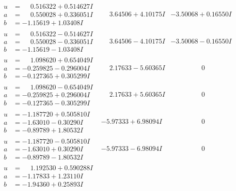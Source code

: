 \documentclass[1p]{elsarticle_modified}
\theoremstyle{definition}
\begin{document}
$$\begin{array}{c|c|c}
 \hline 
\begin{aligned}
u &= \phantom{-}0.516322 + 0.514627 I \\
a &= \phantom{-}0.550028 + 0.336051 I \\
b &= -1.15619 + 1.03408 I\end{aligned}
 & \phantom{-}3.64506 + 4.10175 I & -3.50068 + 0.16550 I \\ \hline\begin{aligned}
u &= \phantom{-}0.516322 - 0.514627 I \\
a &= \phantom{-}0.550028 - 0.336051 I \\
b &= -1.15619 - 1.03408 I\end{aligned}
 & \phantom{-}3.64506 - 4.10175 I & -3.50068 - 0.16550 I \\ \hline\begin{aligned}
u &= \phantom{-}1.098620 + 0.654049 I \\
a &= -0.259825 - 0.296004 I \\
b &= -0.127365 + 0.305299 I\end{aligned}
 & \phantom{-}2.17633 - 5.60365 I & \phantom{-0.000000 } 0 \\ \hline\begin{aligned}
u &= \phantom{-}1.098620 - 0.654049 I \\
a &= -0.259825 + 0.296004 I \\
b &= -0.127365 - 0.305299 I\end{aligned}
 & \phantom{-}2.17633 + 5.60365 I & \phantom{-0.000000 } 0 \\ \hline\begin{aligned}
u &= -1.187720 + 0.505810 I \\
a &= -1.63010 - 0.30290 I \\
b &= -0.89789 + 1.80532 I\end{aligned}
 & -5.97333 + 6.98094 I & \phantom{-0.000000 } 0 \\ \hline\begin{aligned}
u &= -1.187720 - 0.505810 I \\
a &= -1.63010 + 0.30290 I \\
b &= -0.89789 - 1.80532 I\end{aligned}
 & -5.97333 - 6.98094 I & \phantom{-0.000000 } 0 \\ \hline\begin{aligned}
u &= \phantom{-}1.192530 + 0.590288 I \\
a &= -1.17833 + 1.23110 I \\
b &= -1.94360 + 0.25893 I\end{aligned}

\end{array}$$
\end{document}
